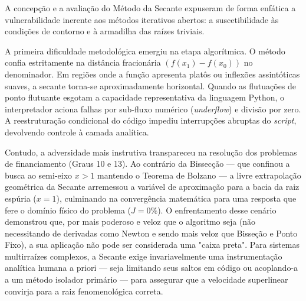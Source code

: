 A concepção e a avaliação do Método da Secante expuseram de forma enfática a vulnerabilidade inerente aos métodos iterativos abertos: a suscetibilidade às condições de contorno e à armadilha das raízes triviais.

A primeira dificuldade metodológica emergiu na etapa algorítmica. O método confia estritamente na distância fracionária $(f(x_1) - f(x_0))$ no denominador. Em regiões onde a função apresenta platôs ou inflexões assintóticas suaves, a secante torna-se aproximadamente horizontal. Quando as flutuações de ponto flutuante esgotam a capacidade representativa da linguagem Python, o interpretador aciona falhas por sub-fluxo numérico (\textit{underflow}) e divisão por zero. A reestruturação condicional do código impediu interrupções abruptas do \textit{script}, devolvendo controle à camada analítica.

Contudo, a adversidade mais instrutiva transpareceu na resolução dos problemas de financiamento (Graus 10 e 13). Ao contrário da Bissecção — que confinou a busca ao semi-eixo $x > 1$ mantendo o Teorema de Bolzano — a livre extrapolação geométrica da Secante arremessou a variável de aproximação para a bacia da raiz espúria ($x=1$), culminando na convergência matemática para uma resposta que fere o domínio físico do problema ($J=0\%$). O enfrentamento desse cenário demonstrou que, por mais poderoso e veloz que o algoritmo seja (não necessitando de derivadas como Newton e sendo mais veloz que Bisseção e Ponto Fixo), a sua aplicação não pode ser considerada uma "caixa preta". Para sistemas multirraízes complexos, a Secante exige invariavelmente uma instrumentação analítica humana a priori — seja limitando seus saltos em código ou acoplando-a a um método isolador primário — para assegurar que a velocidade superlinear convirja para a raiz fenomenológica correta.